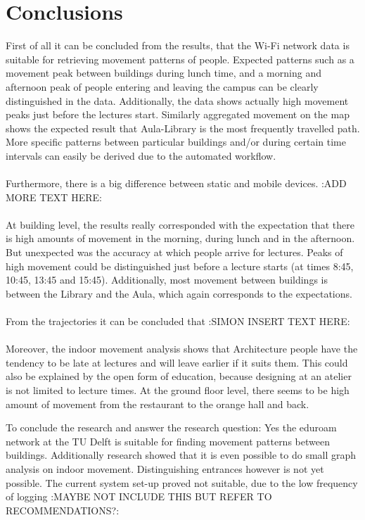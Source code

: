 \chapter{Conclusions}\label{conclusion}
First of all it can be concluded from the results, that the Wi-Fi network data is suitable for retrieving movement patterns of people. Expected patterns such as a movement peak between buildings during lunch time, and a morning and afternoon peak of people entering and leaving the campus can be clearly distinguished in the data. Additionally, the data shows actually high movement peaks just before the lectures start. Similarly aggregated movement on the map shows the expected result that Aula-Library is the most frequently travelled path. More specific patterns between particular buildings and/or during certain time intervals can easily be derived due to the automated workflow.\\\\
Furthermore, there is a big difference between static and mobile devices. :ADD MORE TEXT HERE:\\\\
At building level, the results really corresponded with the expectation that there is high amounts of movement in the morning, during lunch and in the afternoon. But unexpected was the accuracy at which people arrive for lectures. Peaks of high movement could be distinguished just before a lecture starts (at times 8:45, 10:45, 13:45 and 15:45). Additionally, most movement between buildings is between the Library and the Aula, which again corresponds to the expectations.\\\\
From the trajectories it can be concluded that :SIMON INSERT TEXT HERE:\\\\
Moreover, the indoor movement analysis shows that Architecture people have the tendency to be late at lectures and will leave earlier if it suits them. This could also be explained by the open form of education, because designing at an atelier is not limited to lecture times. At the ground floor level, there seems to be high amount of movement from the restaurant to the orange hall and back.

To conclude the research and answer the research question: Yes the eduroam network at the TU Delft is suitable for finding movement patterns between buildings. Additionally research showed that it is even possible to do small graph analysis on indoor movement. Distinguishing entrances however is not yet possible. The current system set-up proved not suitable, due to the low frequency of logging :MAYBE NOT INCLUDE THIS BUT REFER TO RECOMMENDATIONS?: